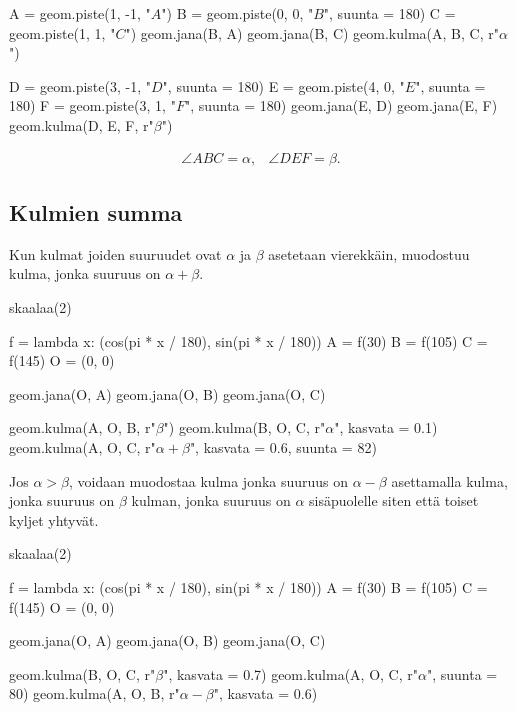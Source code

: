 \begin{esimerkki}
\begin{center}
\begin{kuva}
	A = geom.piste(1, -1, "$A$")
	B = geom.piste(0, 0, "$B$", suunta = 180)
	C = geom.piste(1, 1, "$C$")
	geom.jana(B, A)
	geom.jana(B, C)
	geom.kulma(A, B, C, r"$\alpha$")
	
	D = geom.piste(3, -1, "$D$", suunta = 180)
	E = geom.piste(4, 0, "$E$", suunta = 180)
	F = geom.piste(3, 1, "$F$", suunta = 180)
	geom.jana(E, D)
	geom.jana(E, F)
	geom.kulma(D, E, F, r"$\beta$")
\end{kuva}
\end{center}
\[
\begin{array}{cc}
\displaystyle \angle ABC = \alpha, &
\displaystyle \angle DEF = \beta.
\end{array}
\]
\end{esimerkki}

\subsection*{Kulmien summa}

Kun kulmat joiden suuruudet ovat $\alpha$ ja $\beta$ asetetaan vierekkäin, muodostuu kulma, jonka suuruus on $\alpha + \beta$.

\begin{center}
\begin{kuva}
	skaalaa(2)
	
	f = lambda x: (cos(pi * x / 180), sin(pi * x / 180))
	A = f(30)
	B = f(105)
	C = f(145)
	O = (0, 0)
	
	geom.jana(O, A)
	geom.jana(O, B)
	geom.jana(O, C)
	
	geom.kulma(A, O, B, r"$\beta$")
	geom.kulma(B, O, C, r"$\alpha$", kasvata = 0.1)
	geom.kulma(A, O, C, r"$\alpha + \beta$", kasvata = 0.6, suunta = 82)
\end{kuva}
\end{center}

Jos $\alpha > \beta$, voidaan muodostaa kulma jonka suuruus on $\alpha - \beta$ asettamalla kulma, jonka suuruus on $\beta$ kulman, jonka suuruus on $\alpha$ sisäpuolelle siten että toiset kyljet yhtyvät.

\begin{center}
\begin{kuva}
	skaalaa(2)
	
	f = lambda x: (cos(pi * x / 180), sin(pi * x / 180))
	A = f(30)
	B = f(105)
	C = f(145)
	O = (0, 0)
	
	geom.jana(O, A)
	geom.jana(O, B)
	geom.jana(O, C)
	
	geom.kulma(B, O, C, r"$\beta$", kasvata = 0.7)
	geom.kulma(A, O, C, r"$\alpha$", suunta = 80)
	geom.kulma(A, O, B, r"$\alpha - \beta$", kasvata = 0.6)
\end{kuva}
\end{center}

